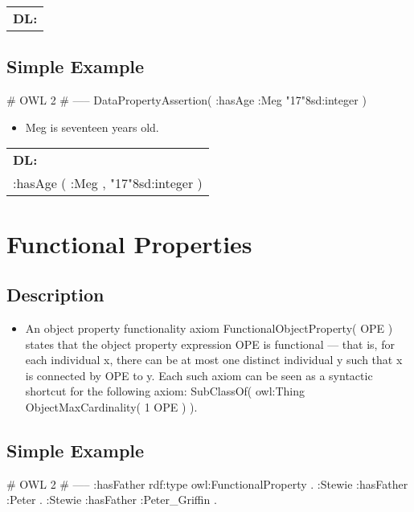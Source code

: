 \documentclass{llncs}
\newenvironment{DL}{
  \scriptsize
  \sffamily
  \vspace{0.3cm}
  \begin{tabular}{l}
	\textbf{DL:} \\

}{
  \end{tabular}
  \linebreak
}
\newcommand{\tb}[1]{\todo[size=\small, color=blue!40]{\textbf{Thomas:} #1}}
\begin{document}
\begin{DL}

\end{DL}

\tb{ToDo: DL}

\subsection{Simple Example}

\begin{ex}
# OWL 2
# -----
DataPropertyAssertion( :hasAge :Meg "17"^^xsd:integer )
\end{ex}

\begin{itemize}
	\item Meg is seventeen years old. 
\end{itemize}

\begin{DL}
:hasAge ( :Meg , "17"^^xsd:integer ) \\
\end{DL}

\section{Functional Properties}

\subsection{Description}

\begin{itemize}
	\item An object property functionality axiom FunctionalObjectProperty( OPE ) states that the object property expression OPE is functional — that is, for each individual x, there can be at most one distinct individual y such that x is connected by OPE to y. Each such axiom can be seen as a syntactic shortcut for the following axiom: SubClassOf( owl:Thing ObjectMaxCardinality( 1 OPE ) ).
\end{itemize}

\subsection{Simple Example}

\begin{ex}
# OWL 2
# -----
:hasFather rdf:type owl:FunctionalProperty . 	
:Stewie :hasFather :Peter . 	
:Stewie :hasFather :Peter_Griffin . 
\end{ex}
\end{document}

